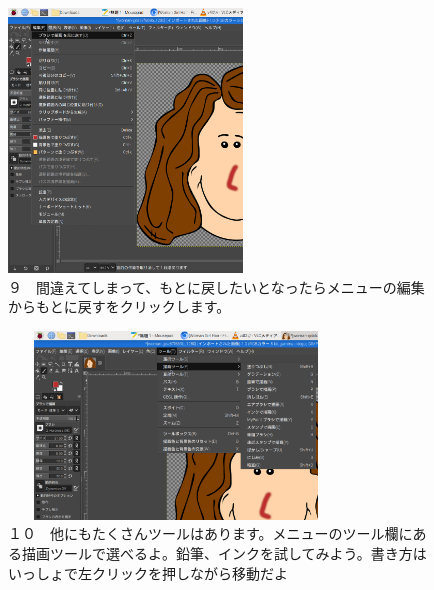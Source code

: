 \documentclass[a4paper,12pt]{jarticle}
\begin{document}
\begin{figure}[ht]
  \begin{minipage}{\textwidth}
    \begin{minipage}{6.984cm}
      \includegraphics[width=6.228cm]{textbook-img132.png}\\
      ９　間違えてしまって、もとに戻したいとなったらメニューの編集からもとに戻すをクリックします。
    \end{minipage}
    \hfill
    \begin{minipage}{8.966cm}
      \includegraphics[width=8.881cm,height=4.997cm]{textbook-img133.png}\\
      １０　他にもたくさんツールはあります。メニューのツール欄にある描画ツールで選べるよ。鉛筆、インクを試してみよう。書き方はいっしょで左クリックを押しながら移動だよ
    \end{minipage}
  \end{minipage}
\end{figure}
\end{document}
